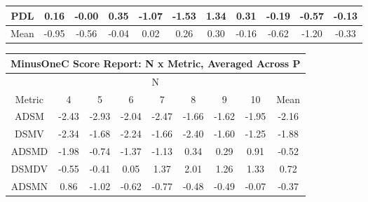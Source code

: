 \begin{longtable}{ | c || c | c | c | c | c | c | c | c | c || c |}
PDL &  \cellcolor[HTML]{F7F7FF} 0.16 &  \cellcolor[HTML]{FFFFFF} -0.00 &  \cellcolor[HTML]{F7F7FF} 0.35 &  \cellcolor[HTML]{FFE7E7} -1.07 &  \cellcolor[HTML]{FFD7D7} -1.53 &  \cellcolor[HTML]{DFDFFF} 1.34 &  \cellcolor[HTML]{F7F7FF} 0.31 &  \cellcolor[HTML]{FFF7F7} -0.19 &  \cellcolor[HTML]{FFEFEF} -0.57 &  \cellcolor[HTML]{FFFFFF} -0.13 \\
\hline
\hline
Mean  &  \cellcolor[HTML]{FFE7E7} -0.95 &  \cellcolor[HTML]{FFEFEF} -0.56 &  \cellcolor[HTML]{FFFFFF} -0.04 &  \cellcolor[HTML]{FFFFFF} 0.02 &  \cellcolor[HTML]{F7F7FF} 0.26 &  \cellcolor[HTML]{F7F7FF} 0.30 &  \cellcolor[HTML]{FFF7F7} -0.16 &  \cellcolor[HTML]{FFEFEF} -0.62 &  \cellcolor[HTML]{FFDFDF} -1.20 &  \cellcolor[HTML]{FFF7F7} -0.33 \\
\hline
\end{longtable}
\begin{longtable}{ | c || c | c | c | c | c | c | c || c |}
\hline
\multicolumn{9}{|c|}{ MinusOneC Score Report: N x Metric, Averaged Across P } \\
\hline
\multicolumn{9}{|c|}{ N } \\
\hline
Metric & 4 & 5 & 6 & 7 & 8 & 9 & 10 & Mean\\
\hline
\hline
\endhead
ADSM &  \cellcolor[HTML]{FFBFBF} -2.43 &  \cellcolor[HTML]{FFB7B7} -2.93 &  \cellcolor[HTML]{FFCFCF} -2.04 &  \cellcolor[HTML]{FFBFBF} -2.47 &  \cellcolor[HTML]{FFD7D7} -1.66 &  \cellcolor[HTML]{FFD7D7} -1.62 &  \cellcolor[HTML]{FFCFCF} -1.95 &  \cellcolor[HTML]{FFC7C7} -2.16 \\
DSMV &  \cellcolor[HTML]{FFC7C7} -2.34 &  \cellcolor[HTML]{FFD7D7} -1.68 &  \cellcolor[HTML]{FFC7C7} -2.24 &  \cellcolor[HTML]{FFD7D7} -1.66 &  \cellcolor[HTML]{FFBFBF} -2.40 &  \cellcolor[HTML]{FFD7D7} -1.60 &  \cellcolor[HTML]{FFDFDF} -1.25 &  \cellcolor[HTML]{FFCFCF} -1.88 \\
ADSMD &  \cellcolor[HTML]{FFCFCF} -1.98 &  \cellcolor[HTML]{FFEFEF} -0.74 &  \cellcolor[HTML]{FFDFDF} -1.37 &  \cellcolor[HTML]{FFDFDF} -1.13 &  \cellcolor[HTML]{F7F7FF} 0.34 &  \cellcolor[HTML]{F7F7FF} 0.29 &  \cellcolor[HTML]{E7E7FF} 0.91 &  \cellcolor[HTML]{FFEFEF} -0.52 \\
DSMDV &  \cellcolor[HTML]{FFEFEF} -0.55 &  \cellcolor[HTML]{FFF7F7} -0.41 &  \cellcolor[HTML]{FFFFFF} 0.05 &  \cellcolor[HTML]{DFDFFF} 1.37 &  \cellcolor[HTML]{CFCFFF} 2.01 &  \cellcolor[HTML]{DFDFFF} 1.26 &  \cellcolor[HTML]{DFDFFF} 1.33 &  \cellcolor[HTML]{EFEFFF} 0.72 \\
ADSMN &  \cellcolor[HTML]{E7E7FF} 0.86 &  \cellcolor[HTML]{FFE7E7} -1.02 &  \cellcolor[HTML]{FFEFEF} -0.62 &  \cellcolor[HTML]{FFEFEF} -0.77 &  \cellcolor[HTML]{FFEFEF} -0.48 &  \cellcolor[HTML]{FFEFEF} -0.49 &  \cellcolor[HTML]{FFFFFF} -0.07 &  \cellcolor[HTML]{FFF7F7} -0.37 \\

\end{longtable}
